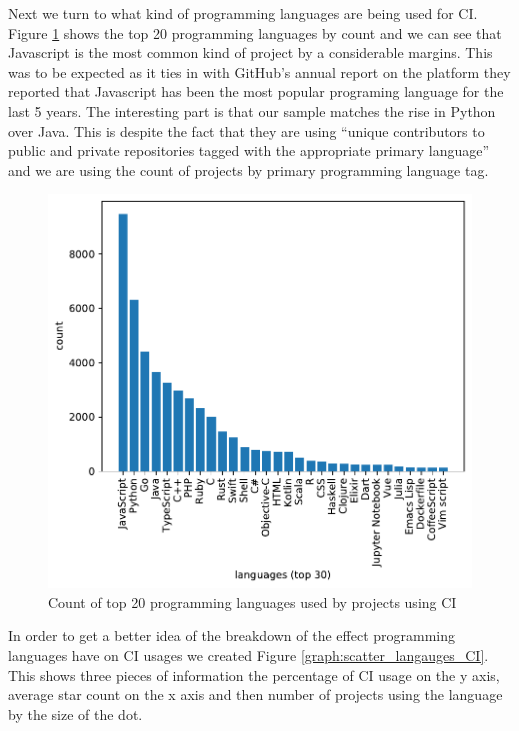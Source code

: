 \documentclass[10pt,conference]{IEEEtran}
\begin{document}
Next we turn to what kind of programming languages are being used for CI. Figure \ref{graph:programming_langs_count_ci} shows the  top 20 programming languages by count and we can see that Javascript is the most common kind of project by a considerable margins. This was to be expected as it ties in with GitHub's annual report \cite{GithubOctoverseResults} on the platform they reported that Javascript has been the most popular programing language for the last 5 years. The interesting part is that our sample matches the rise in Python over Java. This is despite the fact that they are using \enquote{unique contributors to public and private repositories tagged with the appropriate primary language} and we are using the count of projects by primary programming language tag. 

\begin{figure}[!h]
  \centering
  \includegraphics[width=.8\textwidth]{../src/results/languages-topn.pdf}
  \caption{Count of top 20 programming languages used by projects using CI}
  \label{graph:programming_langs_count_ci}
\end{figure}

In order to get a better idea of the breakdown of the effect programming languages have on CI usages we created Figure \ref{graph:scatter_langauges_CI}. This shows three pieces of information the percentage of CI usage on the y axis, average star count on the x axis and then number of projects using the language by the size of the dot. 
\end{document}
